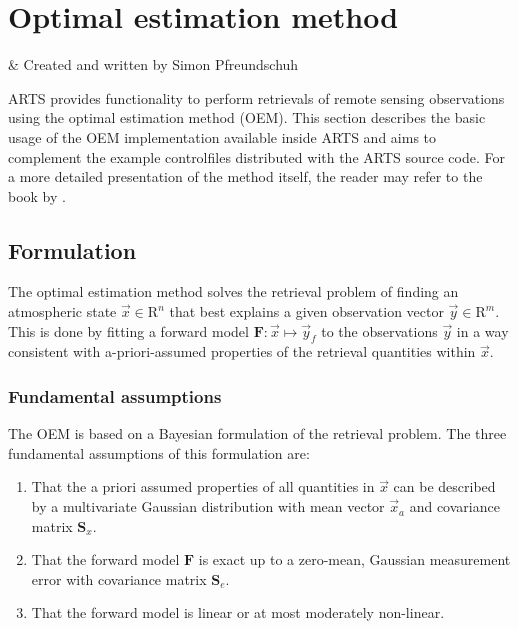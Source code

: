 \graphicspath{{Figs/retrievals/}}

\chapter{Optimal estimation method}
 \label{sec:oem}

 & Created and written by Simon Pfreundschuh\\ 
\stophistory

ARTS provides functionality to perform retrievals of remote sensing
observations using the optimal estimation method (OEM). This section 
describes the basic usage of the OEM implementation available inside ARTS
and aims to complement the example controlfiles distributed with the
ARTS source code. For a more detailed presentation of the method itself,
the reader may refer to the book by \citet{rodgers:00}.

\section{Formulation}

The optimal estimation method solves the retrieval problem of finding an
atmospheric state $\vec{x} \in \mathrm{R}^n$ that best explains a given observation
vector $\vec{y} \in \mathrm{R}^m$. This is done by fitting a forward model
$\mathbf{F}: \vec{x} \mapsto \vec{y}_f$ to the observations $\vec{y}$ in a way
consistent with a-priori-assumed properties of the retrieval quantities
within $\vec{x}$.

\subsection{Fundamental assumptions}

The OEM is based on a Bayesian formulation of the retrieval problem.
The three fundamental assumptions of this formulation are:
\begin{enumerate}
\item That the a priori assumed properties of all quantities in $\vec{x}$ can be described by
 a multivariate Gaussian distribution with mean vector $\vec{x}_a$ and covariance
 matrix $\mathbf{S}_x$.
\item That the forward model $\mathbf{F}$ is exact up to a zero-mean, Gaussian measurement
      error with covariance matrix $\mathbf{S}_e$.
\item That the forward model is linear or at most moderately non-linear.
\end{enumerate}

